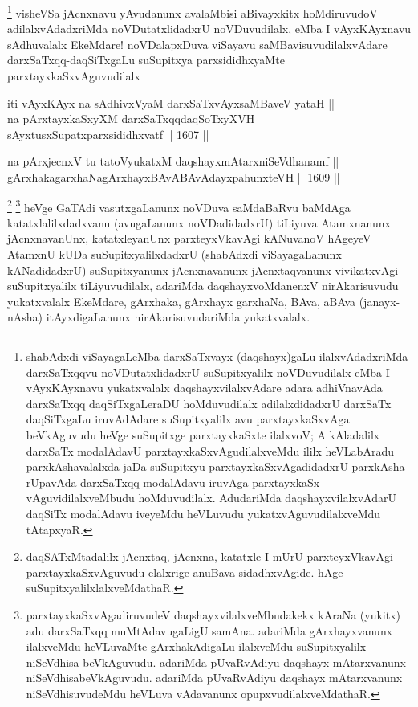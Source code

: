 \begin{artha}
\footnote{shabAdxdi viSayagaLeMba darxSaTxvayx (daqshayx)gaLu ilalxvAdadxriMda darxSaTxqqvu noVDutatxlidadxrU suSupitxyalilx noVDuvudilalx eMba I vAyxKAyxnavu yukatxvalalx daqshayxvilalxvAdare adara adhiVnavAda darxSaTxqq daqSiTxgaLeraDU hoMduvudilalx adilalxdidadxrU darxSaTx daqSiTxgaLu iruvAdAdare suSupitxyalilx avu parxtayxkaSxvAga beVkAguvudu heVge suSupitxge parxtayxkaSxte ilalxvoV; A kAladalilx darxSaTx modalAdavU parxtayxkaSxvAgudilalxveMdu ililx heVLabAradu parxkAshavalalxda jaDa suSupitxyu parxtayxkaSxvAgadidadxrU parxkAsha rUpavAda darxSaTxqq modalAdavu iruvAga parxtayxkaSx vAguvidilalxveMbudu hoMduvudilalx. AdudariMda daqshayxvilalxvAdarU daqSiTx modalAdavu iveyeMdu heVLuvudu yukatxvAguvudilalxveMdu tAtapxyaR.}
visheVSa jAcnxnavu yAvudanunx avalaMbisi aBivayxkitx hoMdiruvudoV adilalxvAdadxriMda noVDutatxlidadxrU noVDuvudilalx, eMba I vAyxKAyxnavu sAdhuvalalx EkeMdare! noVDalapxDuva viSayavu saMBavisuvudilalxvAdare darxSaTxqq-daqSiTxgaLu suSupitxya parxsididhxyaMte parxtayxkaSxvAguvudilalx
\end{artha}



\begin{shl}
iti vAyxKAyx na sAdhivxVyaM darxSaTxvAyxsaMBaveV yataH || \\
na pArxtayxkaSxyXM darxSaTxqqdaqSoTxyXVH sAyxtusxSupatxparxsididhxvatf ||  1607 ||  
\end{shl}

\begin{shl}
na pArxjecnxV tu tatoV\s yukatxM daqshayxmAtarxniSeVdhanamf || \\
gArxhakagarxhaNagArxhayxBAvABAvAdayxpahunxteVH ||  1609 ||  
\end{shl}

\begin{artha}
\footnote{daqSATxMtadalilx jAcnxtaq, jAcnxna, katatxle I mUrU parxteyxVkavAgi parxtayxkaSxvAguvudu elalxrige anuBava sidadhxvAgide. hAge suSupitxyalilxlalxveMdathaR.}
\footnote{parxtayxkaSxvAgadiruvudeV daqshayxvilalxveMbudakekx kAraNa (yukitx) adu darxSaTxqq muMtAdavugaLigU samAna. adariMda gArxhayxvanunx ilalxveMdu heVLuvaMte gArxhakAdigaLu ilalxveMdu suSupitxyalilx niSeVdhisa beVkAguvudu. adariMda pUvaRvAdiyu daqshayx mAtarxvanunx niSeVdhisabeVkAguvudu. adariMda pUvaRvAdiyu daqshayx mAtarxvanunx niSeVdhisuvudeMdu heVLuva vAdavanunx opupxvudilalxveMdathaR.}
heVge GaTAdi vasutxgaLanunx noVDuva saMdaBaRvu baMdAga katatxlalilxdadxvanu (avugaLanunx noVDadidadxrU) tiLiyuva Atamxnanunx jAcnxnavanUnx, katatxleyanUnx parxteyxVkavAgi kANuvanoV hAgeyeV AtamxnU kUDa suSupitxyalilxdadxrU (shabAdxdi viSayagaLanunx kANadidadxrU) suSupitxyanunx jAcnxnavanunx jAcnxtaqvanunx vivikatxvAgi suSupitxyalilx tiLiyuvudilalx, adariMda daqshayxvoMdanenxV nirAkarisuvudu yukatxvalalx EkeMdare, gArxhaka, gArxhayx garxhaNa, BAva, aBAva (janayx-nAsha) itAyxdigaLanunx nirAkarisuvudariMda yukatxvalalx.
\end{artha}


